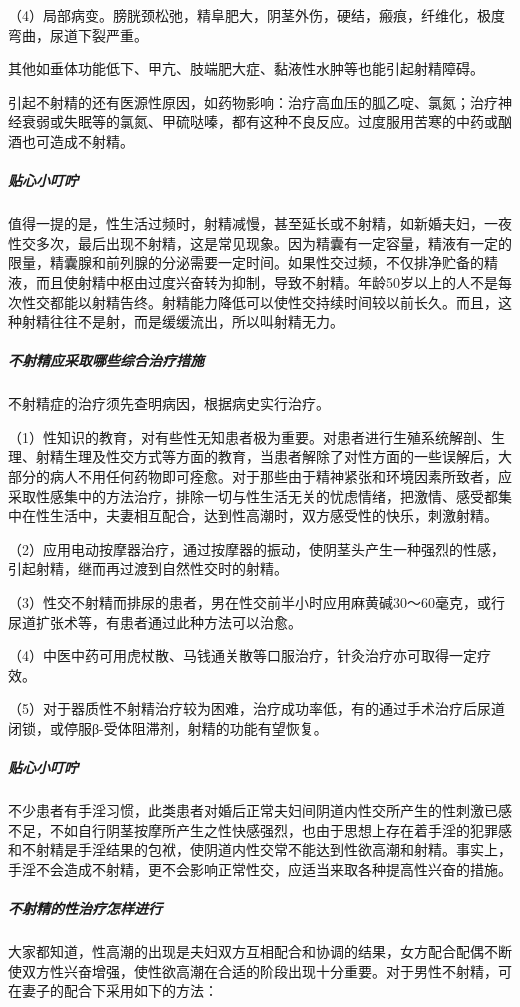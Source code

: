 \begin{enumerate}
（4）局部病变。膀胱颈松弛，精阜肥大，阴茎外伤，硬结，瘢痕，纤维化，极度弯曲，尿道下裂严重。

其他如垂体功能低下、甲亢、肢端肥大症、黏液性水肿等也能引起射精障碍。

引起不射精的还有医源性原因，如药物影响：治疗高血压的胍乙啶、氯氮；治疗神经衰弱或失眠等的氯氮、甲硫哒嗪，都有这种不良反应。过度服用苦寒的中药或酗酒也可造成不射精。

\subparagraph{贴心小叮咛}

值得一提的是，性生活过频时，射精减慢，甚至延长或不射精，如新婚夫妇，一夜性交多次，最后出现不射精，这是常见现象。因为精囊有一定容量，精液有一定的限量，精囊腺和前列腺的分泌需要一定时间。如果性交过频，不仅排净贮备的精液，而且使射精中枢由过度兴奋转为抑制，导致不射精。年龄50岁以上的人不是每次性交都能以射精告终。射精能力降低可以使性交持续时间较以前长久。而且，这种射精往往不是射，而是缓缓流出，所以叫射精无力。

\subparagraph{不射精应采取哪些综合治疗措施}

不射精症的治疗须先查明病因，根据病史实行治疗。

（1）性知识的教育，对有些性无知患者极为重要。对患者进行生殖系统解剖、生理、射精生理及性交方式等方面的教育，当患者解除了对性方面的一些误解后，大部分的病人不用任何药物即可痊愈。对于那些由于精神紧张和环境因素所致者，应采取性感集中的方法治疗，排除一切与性生活无关的忧虑情绪，把激情、感受都集中在性生活中，夫妻相互配合，达到性高潮时，双方感受性的快乐，刺激射精。

（2）应用电动按摩器治疗，通过按摩器的振动，使阴茎头产生一种强烈的性感，引起射精，继而再过渡到自然性交时的射精。

（3）性交不射精而排尿的患者，男在性交前半小时应用麻黄碱30～60毫克，或行尿道扩张术等，有患者通过此种方法可以治愈。

（4）中医中药可用虎杖散、马钱通关散等口服治疗，针灸治疗亦可取得一定疗效。

（5）对于器质性不射精治疗较为困难，治疗成功率低，有的通过手术治疗后尿道闭锁，或停服β-受体阻滞剂，射精的功能有望恢复。

\subparagraph{贴心小叮咛}

不少患者有手淫习惯，此类患者对婚后正常夫妇间阴道内性交所产生的性刺激已感不足，不如自行阴茎按摩所产生之性快感强烈，也由于思想上存在着手淫的犯罪感和不射精是手淫结果的包袱，使阴道内性交常不能达到性欲高潮和射精。事实上，手淫不会造成不射精，更不会影响正常性交，应适当来取各种提高性兴奋的措施。

\subparagraph{不射精的性治疗怎样进行}

大家都知道，性高潮的出现是夫妇双方互相配合和协调的结果，女方配合配偶不断使双方性兴奋增强，使性欲高潮在合适的阶段出现十分重要。对于男性不射精，可在妻子的配合下采用如下的方法：


\end{enumerate}
